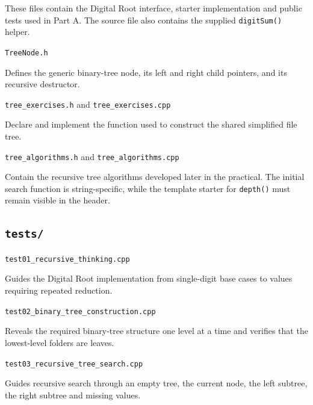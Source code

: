 \documentclass{csc2059practical}
\begin{document}
\smallskip

These files contain the Digital Root interface, starter implementation and
public tests used in Part A. The source file also contains the supplied
\texttt{digitSum()} helper.

\medskip

\noindent
\texttt{TreeNode.h}

\smallskip

Defines the generic binary-tree node, its left and right child pointers, and
its recursive destructor.

\medskip

\noindent
\texttt{tree\_exercises.h} and
\texttt{tree\_exercises.cpp}

\smallskip

Declare and implement the function used to construct the shared simplified
file tree.

\medskip

\noindent
\texttt{tree\_algorithms.h} and
\texttt{tree\_algorithms.cpp}

\smallskip

Contain the recursive tree algorithms developed later in the practical. The
initial search function is string-specific, while the template starter for
\texttt{depth()} must remain visible in the header.

\bigskip


\subsection*{\texttt{tests/}}

\noindent
\texttt{test01\_recursive\_thinking.cpp}

\smallskip

Guides the Digital Root implementation from single-digit base cases to values
requiring repeated reduction.

\medskip

\noindent
\texttt{test02\_binary\_tree\_construction.cpp}

\smallskip

Reveals the required binary-tree structure one level at a time and verifies
that the lowest-level folders are leaves.

\medskip

\noindent
\texttt{test03\_recursive\_tree\_search.cpp}

\smallskip

Guides recursive search through an empty tree, the current node, the left
subtree, the right subtree and missing values.
\end{document}
